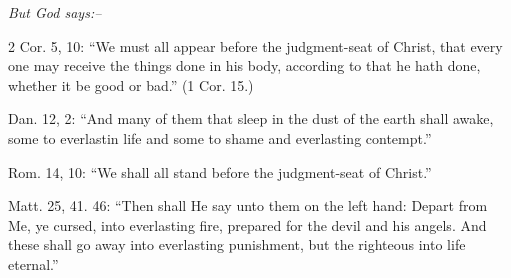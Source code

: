 \documentclass[
]{book}
\begin{document}
\begin{center}
\textsl{But God says:--}
\end{center}

2 Cor. 5, 10: ``We must all appear before the judgment-seat of Christ, that every one may receive the things done in his body, according to that he hath done, whether it be good or bad.'' (1 Cor. 15.)

Dan. 12, 2: ``And many of them that sleep in the dust of the earth shall awake, some to everlastin life and some to shame and everlasting contempt.''

Rom. 14, 10: ``We shall all stand before the judgment-seat of Christ.''

Matt. 25, 41. 46: ``Then shall He say unto them on the left hand: Depart from Me, ye cursed, into everlasting fire, prepared for the devil and his angels. And these shall go away into everlasting punishment, but the righteous into life eternal.''

\printindex
\end{document}
